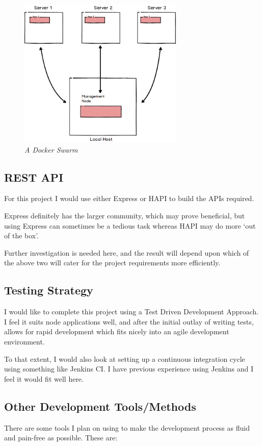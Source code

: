\documentclass{article}
\begin{document}
\begin{figure}[!hb]
\centering
\includegraphics*[width=0.7\textwidth]{components/swarm}
\caption{\em A Docker Swarm}
\label{fig:swarm}
\end{figure}

\newpage
\subsection{REST API}
For this project I would use either Express or HAPI to build the APIs required. 

Express definitely has the larger community, which may prove beneficial, but using Express can sometimes be a tedious task whereas HAPI may do more `out of the box'.

Further investigation is needed here, and the result will depend upon which of the above two will cater for the project requirements more efficiently.

\subsection{Testing Strategy}
I would like to complete this project using a Test Driven Development Approach. I feel it suits node applications well, and after the initial outlay of writing tests, allows for rapid development which fits nicely into an agile development environment.

To that extent, I would also look at setting up a continuous integration cycle using something like Jenkins CI. I have previous experience using Jenkins and I feel it would fit well here. 

\newpage
\subsection{Other Development Tools/Methods}
There are some tools I plan on using to make the development process as fluid and pain-free as possible. These are:
\end{document}
